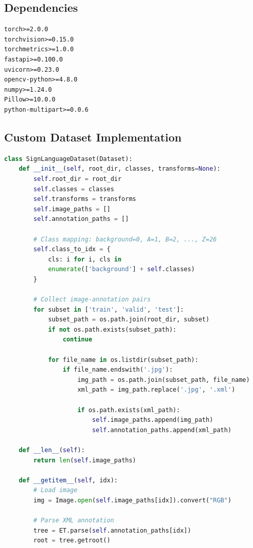 \documentclass[12pt,a4paper]{article}
\begin{document}
\subsection{Dependencies}

\begin{lstlisting}[caption=requirements.txt]
torch>=2.0.0
torchvision>=0.15.0
torchmetrics>=1.0.0
fastapi>=0.100.0
uvicorn>=0.23.0
opencv-python>=4.8.0
numpy>=1.24.0
Pillow>=10.0.0
python-multipart>=0.0.6
\end{lstlisting}

\subsection{Custom Dataset Implementation}

\begin{lstlisting}[language=python, caption=SignLanguageDataset Class]
class SignLanguageDataset(Dataset):
    def __init__(self, root_dir, classes, transforms=None):
        self.root_dir = root_dir
        self.classes = classes
        self.transforms = transforms
        self.image_paths = []
        self.annotation_paths = []
        
        # Class mapping: background=0, A=1, B=2, ..., Z=26
        self.class_to_idx = {
            cls: i for i, cls in 
            enumerate(['background'] + self.classes)
        }
        
        # Collect image-annotation pairs
        for subset in ['train', 'valid', 'test']:
            subset_path = os.path.join(root_dir, subset)
            if not os.path.exists(subset_path):
                continue
            
            for file_name in os.listdir(subset_path):
                if file_name.endswith('.jpg'):
                    img_path = os.path.join(subset_path, file_name)
                    xml_path = img_path.replace('.jpg', '.xml')
                    
                    if os.path.exists(xml_path):
                        self.image_paths.append(img_path)
                        self.annotation_paths.append(xml_path)
    
    def __len__(self):
        return len(self.image_paths)
    
    def __getitem__(self, idx):
        # Load image
        img = Image.open(self.image_paths[idx]).convert("RGB")
        
        # Parse XML annotation
        tree = ET.parse(self.annotation_paths[idx])
        root = tree.getroot()
        

\end{lstlisting}
\end{document}
